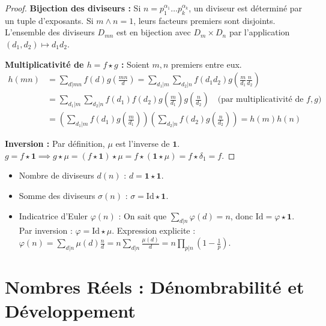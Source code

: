 \documentclass{prepacours}
\begin{document}
\begin{proof}
    \textbf{Bijection des diviseurs :} Si $n = p_1^{\alpha_1} \dots p_k^{\alpha_k}$, un diviseur est déterminé par un tuple d'exposants. Si $m \wedge n = 1$, leurs facteurs premiers sont disjoints. L'ensemble des diviseurs $D_{mn}$ est en bijection avec $D_m \times D_n$ par l'application $(d_1, d_2) \mapsto d_1 d_2$.
    
    \textbf{Multiplicativité de $h = f \star g$ :} Soient $m, n$ premiers entre eux.
    \begin{align*}
        h(mn) &= \sum_{d|mn} f(d)g\left(\frac{mn}{d}\right) = \sum_{d_1|m} \sum_{d_2|n} f(d_1 d_2) g\left(\frac{m}{d_1} \frac{n}{d_2}\right) \\
        &= \sum_{d_1|m} \sum_{d_2|n} f(d_1)f(d_2) g\left(\frac{m}{d_1}\right)g\left(\frac{n}{d_2}\right) \quad \text{(par multiplicativité de } f, g) \\
        &= \left(\sum_{d_1|m} f(d_1)g\left(\frac{m}{d_1}\right)\right) \left(\sum_{d_2|n} f(d_2)g\left(\frac{n}{d_2}\right)\right) = h(m)h(n)
    \end{align*}

    \textbf{Inversion :} Par définition, $\mu$ est l'inverse de $\mathbf{1}$.
    $g = f \star \mathbf{1} \implies g \star \mu = (f \star \mathbf{1}) \star \mu = f \star (\mathbf{1} \star \mu) = f \star \delta_1 = f$.
\end{proof}

\begin{exemple}
    \begin{itemize}
        \item Nombre de diviseurs $d(n)$ : $d = \mathbf{1} \star \mathbf{1}$.
        \item Somme des diviseurs $\sigma(n)$ : $\sigma = \text{Id} \star \mathbf{1}$.
        \item Indicatrice d'Euler $\varphi(n)$ : On sait que $\sum_{d|n} \varphi(d) = n$, donc $\text{Id} = \varphi \star \mathbf{1}$. Par inversion : $\varphi = \text{Id} \star \mu$.
        Expression explicite : $\varphi(n) = \sum_{d|n} \mu(d) \frac{n}{d} = n \sum_{d|n} \frac{\mu(d)}{d} = n \prod_{p|n} (1 - \frac{1}{p})$.
    \end{itemize}
\end{exemple}

\section{Nombres Réels : Dénombrabilité et Développement}
\end{document}
